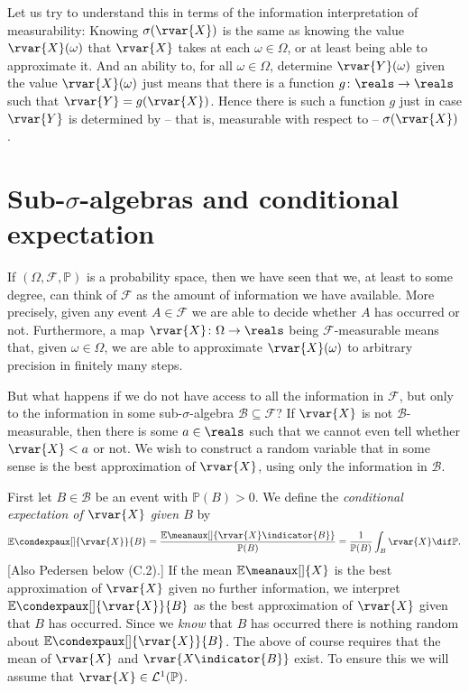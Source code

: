 \documentclass[article, a4paper, 11pt, oneside]{memoir}
\numberwithin{equation}{chapter}
\newcommand{\calB}{\mathcal{B}}
\newcommand{\calF}{\mathcal{F}}
\newcommand{\calL}{\mathcal{L}}
\renewcommand{\P}{\mathbb{P}}
\renewcommand{\mean}[2][]{\mathbb{E}\meanaux[#1]{#2}}
\newcommand{\condexp}[3][]{{\mathbb{E}\condexpaux[#1]{#2}{#3}}}
\begin{document}
Let us try to understand this in terms of the information interpretation of measurability: Knowing $\sigma(\rvar{X})$ is the same as knowing the value $\rvar{X}(\omega)$ that $\rvar{X}$ takes at each $\omega \in \Omega$, or at least being able to approximate it. And an ability to, for all $\omega \in \Omega$, determine $\rvar{Y}(\omega)$ given the value $\rvar{X}(\omega)$ just means that there is a function $g \colon \reals \to \reals$ such that $\rvar{Y} = g(\rvar{X})$. Hence there is such a function $g$ just in case $\rvar{Y}$ is determined by -- that is, measurable with respect to -- $\sigma(\rvar{X})$.





\section[Sub-sigma-algebras and conditional expectation][Sub-$\sigma$-algebras and conditional expectation]{Sub-$\sigma$-algebras and conditional expectation}

If $(\Omega, \calF, \P)$ is a probability space, then we have seen that we, at least to some degree, can think of $\calF$ as the amount of information we have available. More precisely, given any event $A \in \calF$ we are able to decide whether $A$ has occurred or not. Furthermore, a map $\rvar{X} \colon \Omega \to \reals$ being $\calF$-measurable means that, given $\omega \in \Omega$, we are able to approximate $\rvar{X}(\omega)$ to arbitrary precision in finitely many steps.

But what happens if we do not have access to all the information in $\calF$, but only to the information in some sub-$\sigma$-algebra $\calB \subseteq \calF$? If $\rvar{X}$ is not $\calB$-measurable, then there is some $a \in \reals$ such that we cannot even tell whether $\rvar{X} < a$ or not. We wish to construct a random variable that in some sense is the best approximation of $\rvar{X}$, using only the information in $\calB$.

First let $B \in \calB$ be an event with $\P(B) > 0$. We define the \emph{conditional expectation of $\rvar{X}$ given $B$} by
%
\begin{equation*}
    \condexp{\rvar{X}}{B}
        = \frac{\mean{\rvar{X} \indicator{B}}}{\P(B)}
        = \frac{1}{\P(B)} \int_B \rvar{X} \dif\P.
\end{equation*}
%
[Also Pedersen below (C.2).] If the mean $\mean{X}$ is the best approximation of $\rvar{X}$ given no further information, we interpret $\condexp{\rvar{X}}{B}$ as the best approximation of $\rvar{X}$ given that $B$ has occurred. Since we \emph{know} that $B$ has occurred there is nothing random about $\condexp{\rvar{X}}{B}$. The above of course requires that the mean of $\rvar{X}$ and $\rvar{X \indicator{B}}$ exist. To ensure this we will assume that $\rvar{X} \in \calL^1(\P)$.
\end{document}
